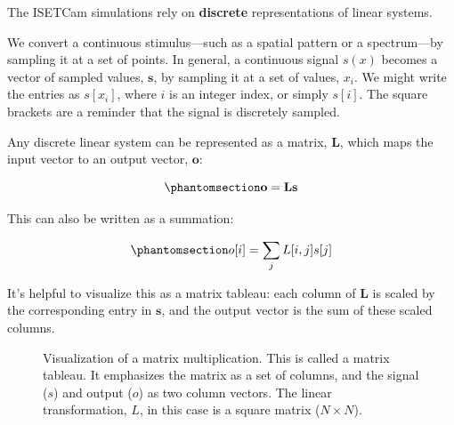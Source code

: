 \documentclass[
  letterpaper,
]{book}
\begin{document}
The ISETCam simulations rely on \textbf{discrete} representations of
linear systems.

We convert a continuous stimulus---such as a spatial pattern or a
spectrum---by sampling it at a set of points. In general, a continuous
signal \(s(x)\) becomes a vector of sampled values, \(\mathbf{s}\), by
sampling it at a set of values, \(x_i\). We might write the entries as
\(s[x_i]\), where \(i\) is an integer index, or simply \(s[i]\). The
square brackets are a reminder that the signal is discretely sampled.

Any discrete linear system can be represented as a matrix,
\(\mathbf{L}\), which maps the input vector to an output vector,
\(\mathbf{o}\):

\begin{equation}\phantomsection\label{eq-linear-matrix}{
\mathbf{o} = \mathbf{L} \mathbf{s}
}\end{equation}

This can also be written as a summation:

\begin{equation}\phantomsection\label{eq-linear-matrix-summation}{
o[i] = \sum_j L[i,j] s[j] 
}\end{equation}

It's helpful to visualize this as a matrix tableau: each column of
\(\mathbf{L}\) is scaled by the corresponding entry in \(\mathbf{s}\),
and the output vector is the sum of these scaled columns.

\begin{figure}


\caption{\label{fig-ls-matrix-tableau}Visualization of a matrix
multiplication. This is called a matrix tableau. It emphasizes the
matrix as a set of columns, and the signal (\(s\)) and output (\(o\)) as
two column vectors. The linear transformation, \(L\), in this case is a
square matrix (\(N \times N\)).}

\end{figure}%
\end{document}
